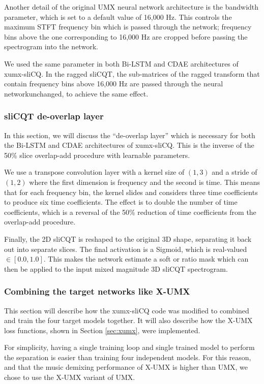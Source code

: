 \documentclass[report.tex]{subfiles}
\begin{document}
Another detail of the original UMX neural network architecture is the bandwidth parameter, which is set to a default value of 16,000 Hz. This controls the maximum STFT frequency bin which is passed through the network; frequency bins above the one corresponding to 16,000 Hz are cropped before passing the spectrogram into the network.

We used the same parameter in both Bi-LSTM and CDAE architectures of xumx-sliCQ. In the ragged sliCQT, the sub-matrices of the ragged transform that contain frequency bins above 16,000 Hz are passed through the neural networkunchanged, to achieve the same effect.

\subsubsection{sliCQT de-overlap layer}
\label{sec:deoverlap}

In this section, we will discuss the ``de-overlap layer'' which is necessary for both the Bi-LSTM and CDAE architectures of xumx-sliCQ. This is the inverse of the 50\% slice overlap-add procedure with learnable parameters.

We use a transpose convolution layer with a kernel size of $(1, 3)$ and a stride of $(1, 2)$ where the first dimension is frequency and the second is time. This means that for each frequency bin, the kernel slides and considers three time coefficients to produce six time coefficients. The effect is to double the number of time coefficients, which is a reversal of the 50\% reduction of time coefficients from the overlap-add procedure.

Finally, the 2D sliCQT is reshaped to the original 3D shape, separating it back out into separate slices. The final activation is a Sigmoid, which is real-valued $\in [0.0, 1.0]$. This makes the network estimate a soft or ratio mask which can then be applied to the input mixed magnitude 3D sliCQT spectrogram.

\subsubsection{Combining the target networks like X-UMX}
\label{sec:xumxinc}

This section will describe how the xumx-sliCQ code was modified to combined and train the four target models together. It will also describe how the X-UMX loss functions, shown in Section \ref{sec:xumx}, were implemented.

For simplicity, having a single training loop and single trained model to perform the separation is easier than training four independent models. For this reason, and that the music demixing performance of X-UMX is higher than UMX, we chose to use the X-UMX variant of UMX.
\end{document}
